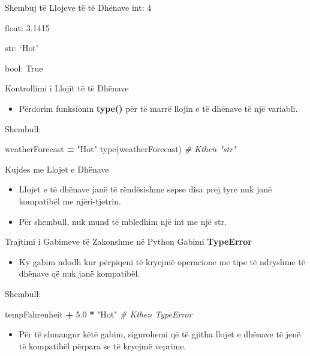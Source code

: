 \documentclass[
  ignorenonframetext,
]{beamer}
\newenvironment{Shaded}{\begin{snugshade}}{\end{snugshade}}
\newcommand{\BuiltInTok}[1]{#1}
\newcommand{\CommentTok}[1]{\textcolor[rgb]{0.56,0.35,0.01}{\textit{#1}}}
\newcommand{\FloatTok}[1]{\textcolor[rgb]{0.00,0.00,0.81}{#1}}
\newcommand{\NormalTok}[1]{#1}
\newcommand{\OperatorTok}[1]{\textcolor[rgb]{0.81,0.36,0.00}{\textbf{#1}}}
\newcommand{\StringTok}[1]{\textcolor[rgb]{0.31,0.60,0.02}{#1}}
\providecommand{\tightlist}{%
  \setlength{\itemsep}{0pt}\setlength{\parskip}{0pt}}
\begin{document}
\begin{frame}{Shembuj të Llojeve të të Dhënave}
\protect\hypertarget{shembuj-tuxeb-llojeve-tuxeb-tuxeb-dhuxebnave}{}
int: 4

float: 3.1415

str: `Hot'

bool: True
\end{frame}

\begin{frame}[fragile]{Kontrollimi i Llojit të të Dhënave}
\protect\hypertarget{kontrollimi-i-llojit-tuxeb-tuxeb-dhuxebnave}{}
\begin{itemize}
\tightlist
\item
  Përdorim funksionin \textbf{type()} për të marrë llojin e të dhënave
  të një variabli.
\end{itemize}

Shembull:

\begin{Shaded}
\begin{Highlighting}[]
\NormalTok{weatherForecast }\OperatorTok{=} \StringTok{"Hot"}
\BuiltInTok{type}\NormalTok{(weatherForecast)  }\CommentTok{\# Kthen "str"}
\end{Highlighting}
\end{Shaded}
\end{frame}

\begin{frame}{Kujdes me Llojet e Dhënave}
\protect\hypertarget{kujdes-me-llojet-e-dhuxebnave}{}
\begin{itemize}
\item
  Llojet e të dhënave janë të rëndësishme sepse disa prej tyre nuk janë
  kompatibël me njëri-tjetrin.
\item
  Për shembull, nuk mund të mbledhim një int me një str.
\end{itemize}
\end{frame}

\begin{frame}[fragile]{Trajtimi i Gabimeve të Zakonshme në Python}
\protect\hypertarget{trajtimi-i-gabimeve-tuxeb-zakonshme-nuxeb-python-2}{}
Gabimi \textbf{TypeError}

\begin{itemize}
\tightlist
\item
  Ky gabim ndodh kur përpiqeni të kryejmë operacione me tipe të ndryshme
  të dhënave që nuk janë kompatibël.
\end{itemize}

Shembull:

\begin{Shaded}
\begin{Highlighting}[]
\NormalTok{  tempFahrenheit }\OperatorTok{+} \FloatTok{5.0} \OperatorTok{*} \StringTok{"Hot"}  \CommentTok{\# Kthen TypeError}
\end{Highlighting}
\end{Shaded}

\begin{itemize}
\tightlist
\item
  Për të shmangur këtë gabim, sigurohemi që të gjitha llojet e dhënave
  të jenë të kompatibël përpara se të kryejmë veprime.
\end{itemize}
\end{frame}
\end{document}
